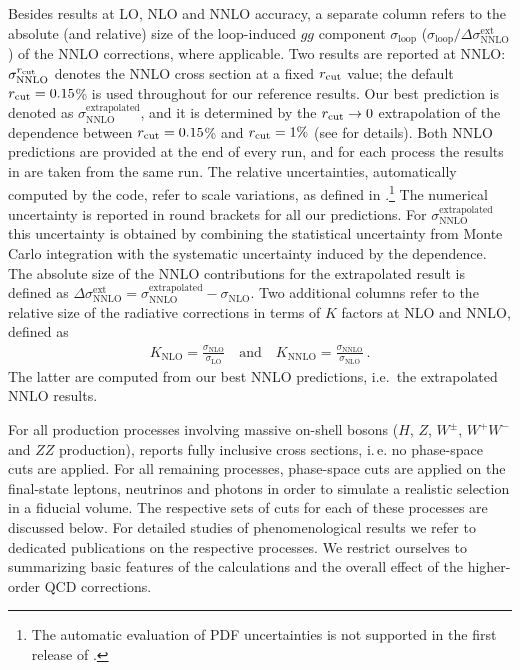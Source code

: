 \documentclass[english,11pt]{article}
\begin{document}
Besides results at LO, NLO and NNLO accuracy, a separate column refers to the 
absolute (and relative) size of the loop-induced $gg$ component $\sigma_{\textrm{loop}}$ ($\sigma_{\textrm{loop}}/\Delta\sigma_{\textrm{NNLO}}^{\textrm{ext}}$) of the NNLO corrections, where applicable. Two results are reported at NNLO: $\sigma_{\textrm{NNLO}}^{r_{\mathrm{cut}}}$ denotes the NNLO cross 
section at a fixed $r_{\mathrm{cut}}{}$ value; the default $r_{\mathrm{cut}}=0.15$\% is used throughout for our 
reference results. Our best prediction is denoted as $\sigma_{\textrm{NNLO}}^{\textrm{extrapolated}}$, 
and it is determined by the $r_{\mathrm{cut}}\rightarrow 0$ extrapolation of the \rcut{} dependence 
between $r_{\mathrm{cut}}=0.15$\% and $r_{\mathrm{cut}}=1\%$ (see  for details). Both NNLO predictions are provided at the end of 
every \Matrix{} run, and for each process the results in  are taken 
from the same \Matrix{} run. The relative uncertainties, automatically computed by the code,
refer to scale variations, as defined in .\footnote{The automatic evaluation of PDF uncertainties is not supported 
in the first release of \Matrix{}.}
The numerical uncertainty is reported in round brackets for all our predictions.
For $\sigma_{\textrm{NNLO}}^{\textrm{extrapolated}}$ this uncertainty 
is obtained by combining the statistical uncertainty from Monte Carlo integration with the systematic uncertainty induced by the \rcut{} dependence.
The absolute size of the NNLO contributions for the extrapolated result is defined as
$\Delta\sigma_{\textrm{NNLO}}^{\textrm{ext}}=\sigma_{\textrm{NNLO}}^{\textrm{extrapolated}}-\sigma_{\textrm{NLO}}$. 
Two additional columns refer to the relative size of the radiative corrections 
in terms of $K$ factors at NLO and NNLO, defined as
\begin{align}
K_{\textrm{NLO}} = \frac{\sigma_{\textrm{NLO}}}{\sigma_{\textrm{LO}}}\quad\textrm{and}\quad K_{\textrm{NNLO}} = \frac{\sigma_{\textrm{NNLO}}}{\sigma_{\textrm{NLO}}}\,.
\end{align}
The latter are computed from our best NNLO predictions, i.e.\ the extrapolated NNLO results.



For all production processes involving massive on-shell bosons ($H$, $Z$, $W^\pm$, $W^+W^-$ and $ZZ$ production),  reports fully inclusive cross sections, i.\,e. no phase-space cuts are applied. For all remaining processes, phase-space cuts are applied on 
the final-state leptons, neutrinos and photons in order to simulate a realistic selection in a fiducial volume.
The respective sets of cuts for each of these processes are discussed below.
For detailed studies of phenomenological results we refer to dedicated publications on the respective processes. We restrict ourselves to summarizing
basic features of the calculations and the overall effect of the higher-order QCD corrections.
\end{document}

